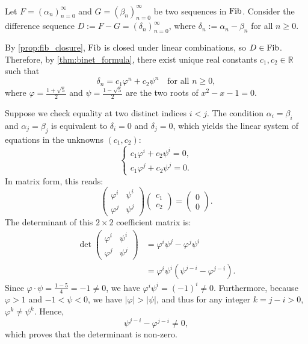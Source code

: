 \begin{exercisesolution}
\label{sol:fib_dimension_two_samples}

Let $F = (\alpha_n)_{n=0}^\infty$ and $G = (\beta_n)_{n=0}^\infty$ be two sequences in $\operatorname{Fib}$. Consider the difference sequence $D := F - G = (\delta_n)_{n=0}^\infty$, where $\delta_n := \alpha_n - \beta_n$ for all $n \ge 0$.

By \cref{prop:fib_closure}, $\operatorname{Fib}$ is closed under linear combinations, so $D \in \operatorname{Fib}$. Therefore, by \cref{thm:binet_formula}, there exist unique real constants $c_1, c_2 \in \mathbb{R}$ such that
\[
\delta_n = c_1 \varphi^n + c_2 \psi^n \quad \text{for all } n \ge 0,
\]
where $\varphi = \frac{1+\sqrt{5}}{2}$ and $\psi = \frac{1-\sqrt{5}}{2}$ are the two roots of $x^2 - x - 1 = 0$.

Suppose we check equality at two distinct indices $i < j$. The condition $\alpha_i = \beta_i$ and $\alpha_j = \beta_j$ is equivalent to $\delta_i = 0$ and $\delta_j = 0$, which yields the linear system of equations in the unknowns $(c_1, c_2)$:
\[
\begin{cases}
c_1 \varphi^i + c_2 \psi^i = 0, \\
c_1 \varphi^j + c_2 \psi^j = 0.
\end{cases}
\]
In matrix form, this reads:
\[
\begin{pmatrix}
\varphi^i & \psi^i \\
\varphi^j & \psi^j
\end{pmatrix}
\begin{pmatrix}
c_1 \\
c_2
\end{pmatrix}
=
\begin{pmatrix}
0 \\
0
\end{pmatrix}.
\]
The determinant of this $2 \times 2$ coefficient matrix is:
\begin{align*}
\det \begin{pmatrix} \varphi^i & \psi^i \\ \varphi^j & \psi^j \end{pmatrix} &= \varphi^i \psi^j - \varphi^j \psi^i \\
&= \varphi^i \psi^i \left(\psi^{j-i} - \varphi^{j-i}\right).
\end{align*}
Since $\varphi \cdot \psi = \frac{1-5}{4} = -1 \ne 0$, we have $\varphi^i \psi^i = (-1)^i \ne 0$. Furthermore, because $\varphi > 1$ and $-1 < \psi < 0$, we have $|\varphi| > |\psi|$, and thus for any integer $k = j - i > 0$, $\varphi^k \ne \psi^k$. Hence,
\[
\psi^{j-i} - \varphi^{j-i} \ne 0,
\]
which proves that the determinant is non-zero.


\end{exercisesolution}
